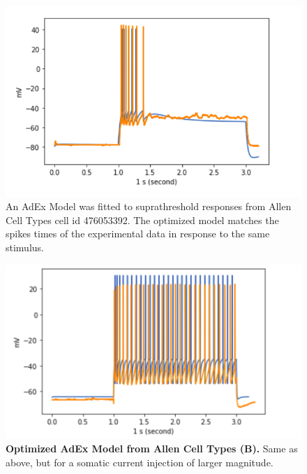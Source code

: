 \begin{figure}
    \centering
    \includegraphics[scale=1]{figures/adexp_fit_allen_spec_id_476053392.png}
    \caption[Optimized AdEx Model from Allen Cell Types (A)]{An AdEx Model was fitted to suprathreshold responses from Allen Cell Types cell id 476053392.
    The optimized model matches the spikes times of the experimental data in response to the same stimulus.}
    \label{fig:specimen_476053392_A}
\end{figure}

\begin{figure}
    \centering
    \includegraphics[scale=1]{figures/28spikesB95}
    \caption[Optimized AdEx Model From Allen Cell Types (B)]{\textbf{Optimized AdEx Model from Allen Cell Types (B).} Same as above, but for a somatic current injection of larger magnitude.}
    \label{fig:specimen_476053392_B}
\end{figure}


